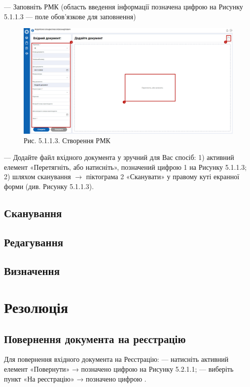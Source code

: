 --- Заповніть РМК (область введення інформації позначена цифрою  на
Рисунку 5.1.1.3 \circled{*} --- поле обов’язкове для заповнення)

\begin{figure}[!htbp]
\centerline{\includegraphics[width=\textwidth]{img/5.1.1.3.png}}
\caption{Рис. 5.1.1.3. Створення РМК}
\end{figure}

--- Додайте файл вхідного документа у зручний для Вас спосіб:
1) активний елемент «Перетягніть, або натисніть», позначений цифрою 1 на Рисунку 5.1.1.3;
2) шляхом сканування $\rightarrow$ піктограма 2 «Сканувати» у правому куті екранної форми (див. Рисунку 5.1.1.3).

\subsection{Сканування}

\subsection{Редагування}

\subsection{Визначення}

\section{Резолюція}

\subsection{Повернення документа на реєстрацію}

Для повернення вхідного документа на Реєстрацію:
--- натисніть активний елемент «Повернути» → позначено цифрою  на Рисунку 5.2.1.1;
--- виберіть пункт «На реєстрацію» → позначено цифрою .

